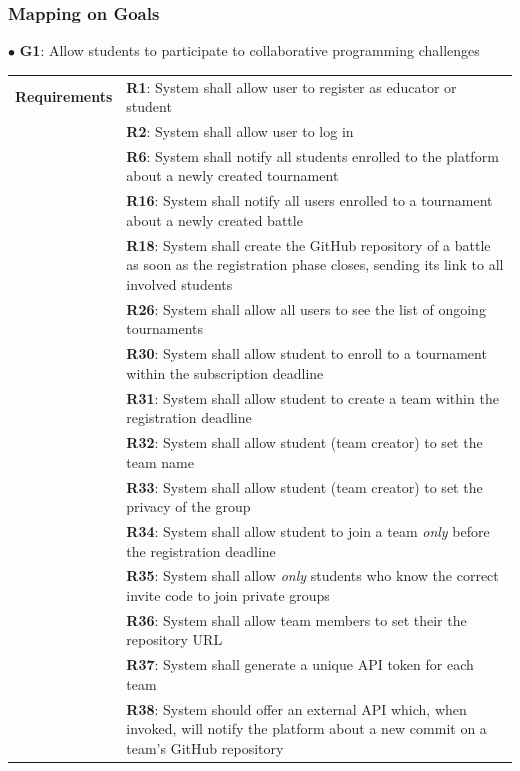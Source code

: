 \subsubsection{Mapping on Goals}
$\bullet$ \textbf{G1}: Allow students to participate to collaborative programming challenges
\begin{center}
    \begin{tabular}{ |m{3cm}|m{10cm}| }
        \hline
        \textbf{Requirements} 
        & \textbf{R1}: System shall allow user to register as educator or student \\
        & \textbf{R2}: System shall allow user to log in \\
        & \textbf{R6}: System shall notify all students enrolled to the platform about a newly created tournament \\
        & \textbf{R16}: System shall notify all users enrolled to a tournament about a newly created battle \\
        & \textbf{R18}: System shall create the GitHub repository of a battle as soon as the registration phase closes, sending its link to all involved students \\
        & \textbf{R26}: System shall allow all users to see the list of ongoing tournaments \\
        & \textbf{R30}: System shall allow student to enroll to a tournament within the subscription deadline \\
        & \textbf{R31}: System shall allow student to create a team within the registration deadline \\
        & \textbf{R32}: System shall allow student (team creator) to set the team name \\
        & \textbf{R33}: System shall allow student (team creator) to set the privacy of the group \\
        & \textbf{R34}: System shall allow student to join a team \textit{only} before the registration deadline \\
        & \textbf{R35}: System shall allow \textit{only} students who know the correct invite code to join private groups \\
        & \textbf{R36}: System shall allow team members to set their the repository URL \\
        & \textbf{R37}: System shall generate a unique API token for each team \\
        & \textbf{R38}: System should offer an external API which, when invoked, will notify the platform about a new commit on a team’s GitHub repository \\

\end{tabular}
\end{center}

